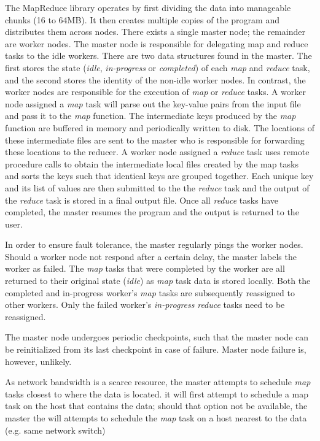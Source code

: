 \documentclass{report}
\begin{document}
The MapReduce library operates by first dividing the data into manageable chunks (16 to 64MB). It then creates multiple copies of the program and distributes them across nodes. There exists a single master node; the remainder are worker nodes. The master node is responsible for delegating map and reduce tasks to the idle workers. There are two data structures found in the master. The first stores the state (\textit{idle}, \textit{in-progress} or \textit{completed}) of each \textit{map} and \textit{reduce} task, and the second stores the identity of the non-idle worker nodes. In contrast, the worker nodes are responsible for the execution of \textit{map} or \textit{reduce} tasks. A worker node assigned a \textit{map} task will parse out the key-value pairs from the input file and pass it to the \textit{map} function. The intermediate keys produced by the \textit{map} function are buffered in memory and periodically written to disk. The locations of these intermediate files are sent to the master who is responsible for forwarding these locations to the reducer. A worker node assigned a \textit{reduce} task uses remote procedure calls to obtain the intermediate local files created by the map tasks and sorts the keys such that identical keys are grouped together. Each unique key and its list of values are then submitted to the the \textit{reduce} task and the output of the \textit{reduce} task is stored in a final output file. Once all \textit{reduce} tasks have completed, the master resumes the program and the output is returned to the user.

In order to ensure fault tolerance, the master regularly pings the worker nodes. Should a worker node not respond after a certain delay, the master labels the worker as failed. The \textit{map} tasks that were completed by the worker are all returned to their original state (\textit{idle}) as \textit{map} task data is stored locally. Both the completed and in-progress worker's \textit{map} tasks are subsequently reassigned to other workers. Only the failed worker's \textit{in-progress} \textit{reduce} tasks need to be reassigned.

The master node undergoes periodic checkpoints, such that the master node can be reinitialized from its last checkpoint in case of failure. Master node failure is, however, unlikely.

As network bandwidth is a scarce resource, the master attempts to schedule \textit{map} tasks closest to where the data is located. it will first attempt to schedule a map task on the host that contains the data; should that option not be available, the master the will attempts to schedule the \textit{map} task on a host nearest to the data (e.g. same network switch)
\end{document}
